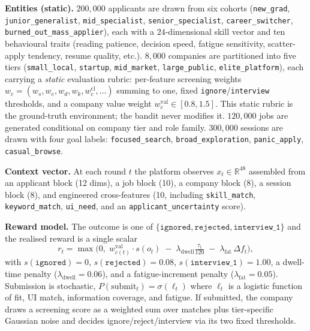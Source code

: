 \documentclass[11pt,a4paper]{article}
\begin{document}
\textbf{Entities (static).}
$200{,}000$ applicants are drawn from six cohorts (\texttt{new\_grad},
\texttt{junior\_generalist}, \texttt{mid\_specialist}, \texttt{senior\_specialist},
\texttt{career\_switcher}, \texttt{burned\_out\_mass\_applier}), each with a
$24$-dimensional skill vector and ten behavioural traits (reading patience,
decision speed, fatigue sensitivity, scatter-apply tendency, resume quality,
etc.). $8{,}000$ companies are partitioned into five tiers
(\texttt{small\_local}, \texttt{startup}, \texttt{mid\_market},
\texttt{large\_public}, \texttt{elite\_platform}), each carrying a \emph{static}
evaluation rubric: per-feature screening weights $w_c=(w_s, w_e, w_d, w_k,
w_c^{\mathrm{cl}},\ldots)$ summing to one, fixed
\texttt{ignore}/\texttt{interview} thresholds, and a company value weight
$w^{\mathrm{val}}_c\in[0.8,1.5]$. This static rubric is the ground-truth
environment; the bandit never modifies it. $120{,}000$ jobs are generated
conditional on company tier and role family. $300{,}000$ sessions are drawn
with four goal labels: \texttt{focused\_search}, \texttt{broad\_exploration},
\texttt{panic\_apply}, \texttt{casual\_browse}.

\textbf{Context vector.}
At each round $t$ the platform observes $x_t \in \mathbb{R}^{48}$ assembled
from an applicant block (12 dims), a job block (10), a company block (8), a
session block (8), and engineered cross-features (10, including
\texttt{skill\_match}, \texttt{keyword\_match}, \texttt{ui\_need}, and an
\texttt{applicant\_uncertainty} score).

\textbf{Reward model.}
The outcome is one of $\{\texttt{ignored}, \texttt{rejected}, \texttt{interview\_1}\}$
and the realised reward is a single scalar
\begin{equation}
r_t = \max\!\Big(0,\; w^{\mathrm{val}}_{c(t)}\cdot s(o_t)
       \;-\; \lambda_{\mathrm{dwell}}\tfrac{\tau_t}{120}
       \;-\; \lambda_{\mathrm{fat}}\,\Delta f_t\Big),
\label{eq:reward}
\end{equation}
with $s(\texttt{ignored})=0$, $s(\texttt{rejected})=0.08$,
$s(\texttt{interview\_1})=1.00$, a dwell-time penalty
($\lambda_{\mathrm{dwell}}=0.06$), and a fatigue-increment penalty
($\lambda_{\mathrm{fat}}=0.05$). Submission is stochastic,
$P(\mathrm{submit}_t)=\sigma(\ell_t)$ where $\ell_t$ is a logistic function of
fit, UI match, information coverage, and fatigue. If submitted, the company
draws a screening score as a weighted sum over matches plus tier-specific
Gaussian noise and decides ignore/reject/interview via its two fixed thresholds.
\end{document}
